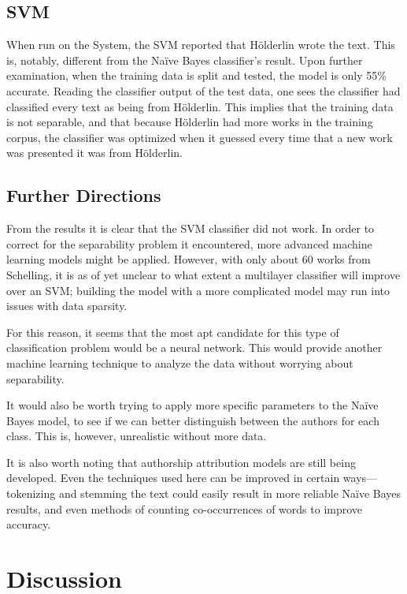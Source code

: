 \documentclass[11pt,letterpaper]{article}
\begin{document}
\subsection{SVM}
When run on the System, the SVM reported that H{\"o}lderlin wrote the text. This is, notably, different from the Na{\"i}ve Bayes classifier's result. Upon further examination, when the training data is split and tested, the model is only 55\% accurate. Reading the classifier output of the test data, one sees the classifier had classified every text as being from H{\"o}lderlin. This implies that the training data is not separable, and that because H{\"o}lderlin had more works in the training corpus, the classifier was optimized when it guessed every time that a new work was presented it was from H{\"o}lderlin.


\subsection{Further Directions}

From the results it is clear that the SVM classifier did not work. In order to correct for the separability problem it encountered, more advanced machine learning models might be applied. However, with only about 60 works from Schelling, it is as of yet unclear to what extent a multilayer classifier will improve over an SVM; building the model with a more complicated model may run into issues with data sparsity.

For this reason, it seems that the most apt candidate for this type of classification problem would be a neural network. This would provide another machine learning technique to analyze the data without worrying about separability.

It would also be worth trying to apply more specific parameters to the Na{\"i}ve Bayes model, to see if we can better distinguish between the authors for each class. This is, however, unrealistic without more data.

It is also worth noting that authorship attribution models are still being developed. Even the techniques used here can be improved in certain ways---tokenizing and stemming the text could easily result in more reliable Na{\"i}ve Bayes results, and even methods of counting co-occurrences of words to improve accuracy.

\section{Discussion}
\end{document}
